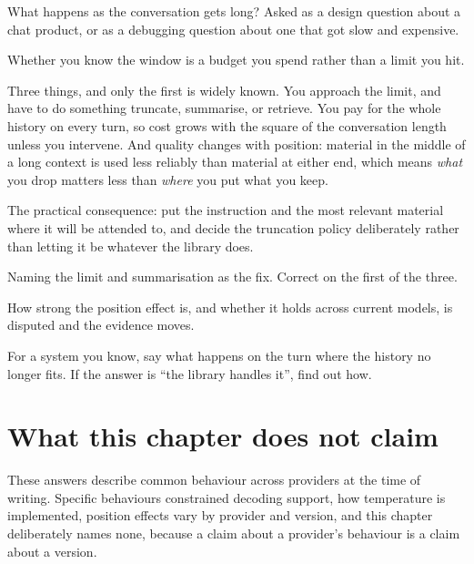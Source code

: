 \begin{bankq}{What happens as the conversation gets long?}
\qasked
Asked as a design question about a chat product, or as a debugging question
about one that got slow and expensive.

\qtested
Whether you know the window is a budget you spend rather than a limit you hit.

\qstaff
Three things, and only the first is widely known. You approach the limit, and
have to do something \dash{} truncate, summarise, or retrieve. You pay for the
whole history on every turn, so cost grows with the square of the conversation
length unless you intervene. And quality changes with position: material in the
middle of a long context is used less reliably than material at either end,
which means \emph{what} you drop matters less than \emph{where} you put what
you keep.

The practical consequence: put the instruction and the most relevant material
where it will be attended to, and decide the truncation policy deliberately
rather than letting it be whatever the library does.

\qsenior
Naming the limit and summarisation as the fix. Correct on the first of the
three.

\qcontested
How strong the position effect is, and whether it holds across current models,
is disputed and the evidence moves. 

\qdrill
For a system you know, say what happens on the turn where the history no longer
fits. If the answer is ``the library handles it'', find out how.
\end{bankq}

\section*{What this chapter does not claim}

These answers describe common behaviour across providers at the time of
writing. Specific behaviours \dash{} constrained decoding support, how
temperature is implemented, position effects \dash{} vary by provider and
version, and this chapter deliberately names none, because a claim about a
provider's behaviour is a claim about a version.
